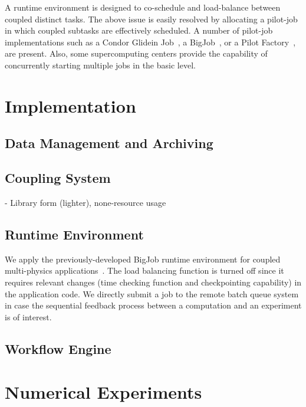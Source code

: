 \documentclass[10pt,conference]{IEEEtran}
\begin{document}
A runtime environment is designed to co-schedule and load-balance between
coupled distinct tasks. The above issue is easily resolved by allocating
a pilot-job in which coupled subtasks are effectively scheduled. A number of
pilot-job implementations such as a Condor Glidein Job~\cite{Condor},
a BigJob~\cite{saga_royalsoc}, or a Pilot Factory~\cite{PilotFactory},
are present. Also, some supercomputing centers provide the capability of
concurrently starting multiple jobs in the basic level.

\section{Implementation}
\label{sec:implementation}

\subsection{Data Management and Archiving}

\subsection{Coupling System}
- Library form (lighter), none-resource usage

\subsection{Runtime Environment}
We apply the previously-developed BigJob runtime environment for coupled
multi-physics applications~\cite{CCGrid_Hybrid}. The load balancing function
is turned off since it requires relevant changes (time checking function and
checkpointing capability) in the application code.
We directly submit a job to the remote batch queue system in case the
sequential feedback process between a computation and an experiment is
of interest.

\subsection{Workflow Engine}

\section{Numerical Experiments}
\label{sec:experiment}
\end{document}
